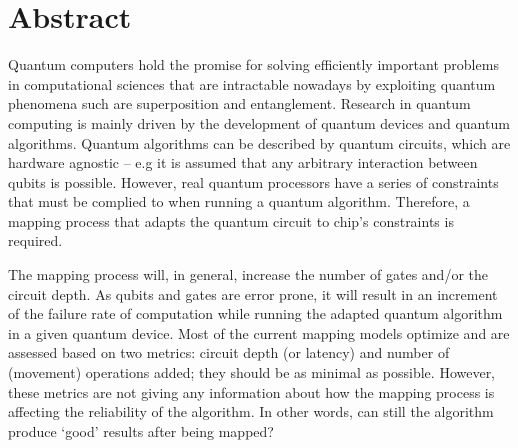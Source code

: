 \chapter*{Abstract}




Quantum computers hold the promise for solving efficiently important problems in computational sciences that are intractable nowadays by exploiting quantum phenomena such are superposition and entanglement. 
 Research in quantum computing is mainly driven by the development of quantum devices and quantum algorithms. Quantum algorithms can be described by quantum circuits, which are hardware agnostic -- e.g it is assumed that any arbitrary interaction between qubits is possible. However, real quantum processors have a series of constraints that must be complied to when running a quantum algorithm. Therefore, a mapping process that adapts the quantum circuit to  chip's constraints is required.
 
 The mapping process will, in general, increase the number of gates and/or the circuit depth. As qubits and gates are error prone, it will result in an increment of the failure rate of computation while running the adapted quantum algorithm in a given quantum device. Most of the current mapping models optimize and are assessed based  on two metrics: circuit depth (or latency) and number of (movement) operations added; they should be as minimal as possible. However, these metrics are not giving any information about how the mapping process is affecting the reliability of the algorithm. In other words, can still the algorithm produce `good' results after being mapped?   
 
